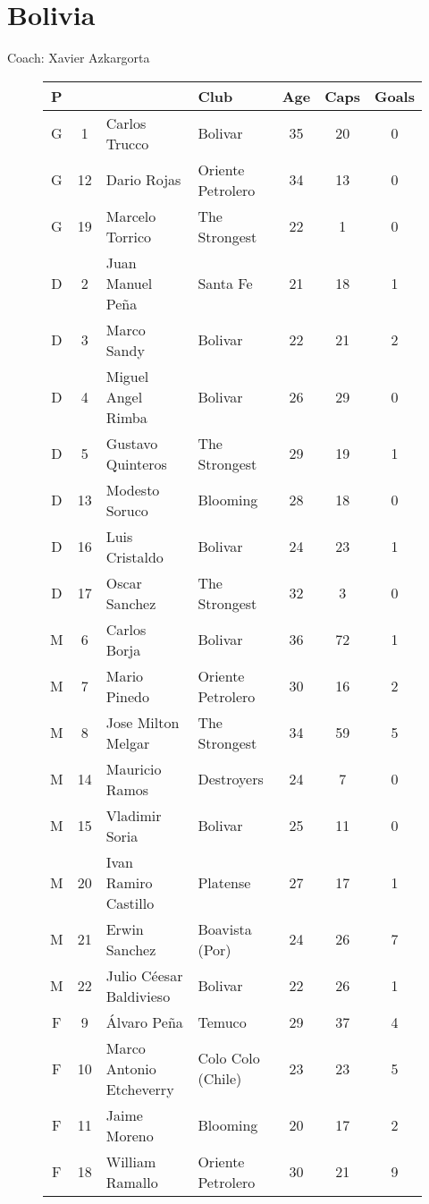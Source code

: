 \chapter{Bolivia}
\newline
\newline
Coach: Xavier Azkargorta
\begin{figure}[H]
\begin{tabular}{c c l l c c c}
P & & & Club & Age & Caps & Goals \\ \hline
G & 1 & Carlos Trucco & Bolivar &  35 & 20 & 0 \\
G & 12 & Dario Rojas & Oriente Petrolero & 34 & 13 & 0 \\
G & 19 & Marcelo Torrico & The Strongest & 22 & 1 & 0 \\ \hline
D & 2 & Juan Manuel Pe{\~n}a & Santa Fe & 21 & 18 & 1 \\
D & 3 & Marco Sandy & Bolivar & 22 & 21 & 2 \\
D & 4 & Miguel Angel Rimba & Bolivar & 26 & 29 & 0 \\
D & 5 & Gustavo Quinteros & The Strongest & 29 & 19 & 1 \\
D & 13 & Modesto Soruco & Blooming & 28 & 18 & 0 \\
D & 16 & Luis Cristaldo & Bolivar & 24 & 23 & 1 \\
D & 17 & Oscar Sanchez & The Strongest & 32 & 3 & 0 \\ \hline
M & 6 & Carlos Borja & Bolivar & 36 & 72 & 1 \\
M & 7 & Mario Pinedo & Oriente Petrolero & 30 & 16 & 2 \\
M & 8 & Jose Milton Melgar & The Strongest & 34 & 59 & 5 \\
M & 14 & Mauricio Ramos & Destroyers & 24 & 7 & 0 \\
M & 15 & Vladimir Soria & Bolivar & 25 & 11 & 0 \\
M & 20 & Ivan Ramiro Castillo & Platense & 27 & 17 & 1 \\
M & 21 & Erwin Sanchez & Boavista (Por) & 24 & 26 & 7 \\
M & 22 & Julio C{\'e}esar Baldivieso & Bolivar & 22 & 26 & 1 \\ \hline
F & 9 & {\'A}lvaro Pe{\~n}a & Temuco & 29 & 37 & 4 \\
F & 10 & Marco Antonio Etcheverry & Colo Colo (Chile) & 23 & 23 & 5 \\
F & 11 & Jaime Moreno & Blooming & 20 & 17 & 2 \\
F & 18 & William Ramallo & Oriente Petrolero & 30 & 21 & 9 \\ \hline
\end{tabular}
\end{figure}

